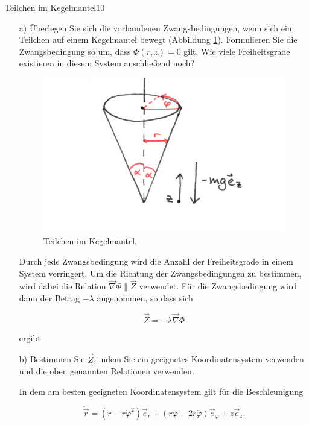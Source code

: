 \begin{exercise}{Teilchen im Kegelmantel}{10}


  \begin{enumerate}
    \item[a)] Überlegen Sie sich die vorhandenen Zwangsbedingungen, wenn sich ein
    Teilchen auf einem Kegelmantel bewegt (Abbildung \ref{fig:TiK}).
    Formulieren Sie die Zwangsbedingung
    so um, dass $\Phi(r,z) = 0$ gilt. Wie viele Freiheitsgrade existieren
    in diesem System anschlie\ss{}end noch?

    \FloatBarrier
    \begin{figure}
      \centering
      \includegraphics[width = 7 cm]{Kegel.jpg}
      \caption{Teilchen im Kegelmantel.}
      \label{fig:TiK}
    \end{figure}

    \item[\bullet]Durch jede Zwangsbedingung wird die Anzahl der Freiheitsgrade in einem System
    verringert. Um die Richtung der Zwangsbedingungen zu bestimmen, wird dabei
    die Relation $ \vec{\nabla} \Phi \parallel \vec{Z}$ verwendet. Für die
    Zwangsbedingung wird dann der Betrag $-\lambda$ angenommen, so dass sich

    \begin{equation}
      \vec{Z} = - \lambda \vec{\nabla} \Phi
    \end{equation}

    ergibt.

    \item[b)] Bestimmen Sie $\vec{Z}$, indem Sie ein geeignetes Koordinatensystem
    verwenden und die oben genannten Relationen verwenden.

    \item[\bullet]In dem am besten geeigneten Koordinatensystem gilt für die Beschleunigung

    \begin{equation}
      \ddot{\vec{r}} = ( \ddot{r}-r\dot{\varphi}^2)\vec{e}_{r} + (r\ddot{\varphi}
      + 2\dot{r}\dot{\varphi})\vec{e}_{\varphi} + \ddot{z}\vec{e}_{z}.
      \label{eqn:Geschw}
    \end{equation}


\end{enumerate}
\end{exercise}
